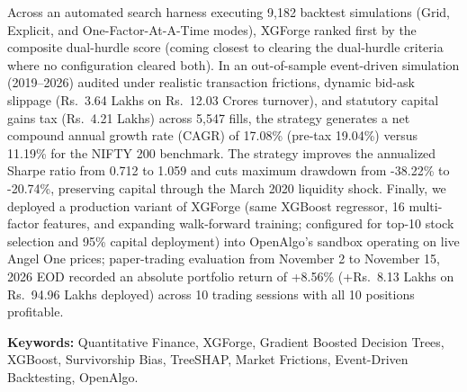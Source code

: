 Across an automated search harness executing 9,182 backtest simulations (Grid, Explicit, and One-Factor-At-A-Time modes), XGForge ranked first by the composite dual-hurdle score (coming closest to clearing the dual-hurdle criteria where no configuration cleared both). In an out-of-sample event-driven simulation (2019--2026) audited under realistic transaction frictions, dynamic bid-ask slippage (\textsf{Rs.~}3.64 Lakhs on \textsf{Rs.~}12.03 Crores turnover), and statutory capital gains tax (\textsf{Rs.~}4.21 Lakhs) across 5,547 fills, the strategy generates a net compound annual growth rate (CAGR) of 17.08\% (pre-tax 19.04\%) versus 11.19\% for the NIFTY 200 benchmark. The strategy improves the annualized Sharpe ratio from 0.712 to 1.059 and cuts maximum drawdown from -38.22\% to -20.74\%, preserving capital through the March 2020 liquidity shock. Finally, we deployed a production variant of XGForge (same XGBoost regressor, 16 multi-factor features, and expanding walk-forward training; configured for top-10 stock selection and 95\% capital deployment) into OpenAlgo’s sandbox operating on live Angel One prices; paper-trading evaluation from November 2 to November 15, 2026 EOD recorded an absolute portfolio return of +8.56\% (+\textsf{Rs.~}8.13 Lakhs on \textsf{Rs.~}94.96 Lakhs deployed) across 10 trading sessions with all 10 positions profitable.

\vspace{0.5cm}
\noindent\textbf{Keywords:} Quantitative Finance, XGForge, Gradient Boosted Decision Trees, XGBoost, Survivorship Bias, TreeSHAP, Market Frictions, Event-Driven Backtesting, OpenAlgo.
\clearpage
